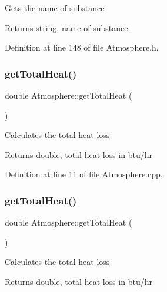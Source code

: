 Gets the name of substance \begin{DoxyReturn}{Returns}
string, name of substance 
\end{DoxyReturn}


Definition at line 148 of file Atmosphere.\+h.

\mbox{\label{class_atmosphere_ad3dd28020262aee76d374cbfb7998e46}} 
\subsubsection{\texorpdfstring{get\+Total\+Heat()}{getTotalHeat()}\hspace{0.1cm}{\footnotesize\ttfamily [1/3]}}
{\footnotesize\ttfamily double Atmosphere\+::get\+Total\+Heat (\begin{DoxyParamCaption}{ }\end{DoxyParamCaption})}

Calculates the total heat loss \begin{DoxyReturn}{Returns}
double, total heat loss in btu/hr 
\end{DoxyReturn}


Definition at line 11 of file Atmosphere.\+cpp.

\mbox{\label{class_atmosphere_ad3dd28020262aee76d374cbfb7998e46}} 
\subsubsection{\texorpdfstring{get\+Total\+Heat()}{getTotalHeat()}\hspace{0.1cm}{\footnotesize\ttfamily [2/3]}}
{\footnotesize\ttfamily double Atmosphere\+::get\+Total\+Heat (\begin{DoxyParamCaption}{ }\end{DoxyParamCaption})}

Calculates the total heat loss \begin{DoxyReturn}{Returns}
double, total heat loss in btu/hr 
\end{DoxyReturn}
\mbox{\label{class_atmosphere_ad3dd28020262aee76d374cbfb7998e46}} 
